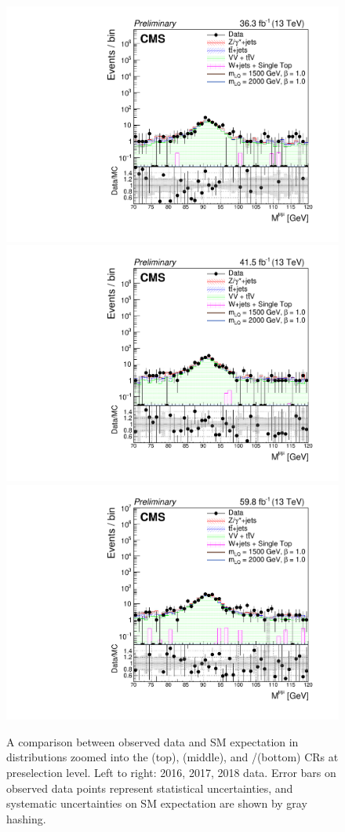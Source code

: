 \begin{figure}[H]
    {\includegraphics[width=.32\textwidth]{Images/Analysis/Results_2016_Unblinded/Plots/Preselection/BasicLQ_uujj_M_uu_controlzoom_VVRegion.pdf}}
    {\includegraphics[width=.32\textwidth]{Images/Analysis/Results_2017_Unblinded/Plots/Preselection/BasicLQ_uujj_M_uu_controlzoom_VVRegion.pdf}}
    {\includegraphics[width=.32\textwidth]{Images/Analysis/Results_2018_Unblinded/Plots/Preselection/BasicLQ_uujj_M_uu_controlzoom_VVRegion.pdf}}
    \caption{A comparison between observed data and SM expectation in \Muu distributions zoomed into the \ZJETS (top), \ttbar (middle), and \VV/\TTV (bottom) CRs at preselection level. Left to right: 2016, 2017, 2018 data. Error bars on observed data points represent statistical uncertainties, and systematic uncertainties on SM expectation are shown by gray hashing.}
    \label{figapp:preselmasszoom}
\end{figure}

